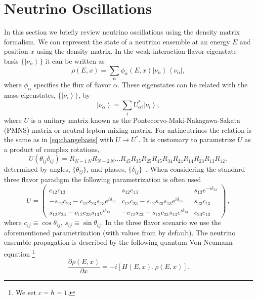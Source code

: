 \documentclass[3p,12pt]{elsarticle}
\newcommand{\bra}[1]{\ensuremath{\left\langle#1\right|}}
\newcommand{\ket}[1]{\ensuremath{\left|#1\right\rangle}}
\newcommand{\pa}[2]{\frac{\partial #1}{\partial #2}}
\begin{document}
\section{Neutrino Oscillations}
\label{sec:theory} 
In this section we briefly review neutrino oscillations
using the density matrix formalism.
We can represent the state of a neutrino ensemble at an energy $E$
and position $x$ using the density matrix. In the weak-interaction flavor-eigenstate basis
$\{\ket{\nu_\alpha}\}$  it can be written as
\begin{equation}
\rho(E,x) = \sum_\alpha \phi_\alpha(E,x) \ket{\nu_\alpha}\bra{\nu_\alpha} , 
\label{eq:state}
\end{equation}
where $\phi_\alpha$ specifies the flux of flavor $\alpha$.
These eigenstates can be related with the mass eigenstates,  $\{ \ket{\nu_i}  \}$, by
\begin{equation}
\ket{\nu_\alpha} = \sum_i U^*_{\alpha i} \ket{\nu_i} ,
\label{eq:changebasis}
\end{equation}
where $U$ is a unitary matrix known as the Pontecorvo-Maki-Nakagawa-Sakata (PMNS)
matrix or neutral lepton mixing matrix. For antineutrinos the relation
is the same as in 
\eqref{eq:changebasis} with $U \to U^*$.
It is customary to parametrize $U$ as a product of complex rotations,
\begin{equation}
\label{eq:mixing}
U(\theta_{ij}\delta_{ij})=R_{N-1\, N} R_{N-2\, N} ... R_{45} R_{35} R_{25} R_{15}
R_{34} R_{24} R_{14} R_{23} R_{13} R_{12}, 
\end{equation}
determined by angles, $\{\theta_{ij}\}$, and phases, $\{ \delta_{ij}
\}$~\cite{SQUIDS}. When considering the standard three flavor paradigm
the following parametrization is often used
\begin{equation}
U
=
\begin{pmatrix}
c_{12} c_{13} & s_{12} c_{13} & s_{13} e^{-i\delta_{13}} \\ 
- s_{12} c_{23} - c_{12} s_{23} s_{13} e^{i\delta_{13}} & c_{12} c_{23} - s_{12} s_{23} s_{13} e^{i\delta_{13}} & s_{23} c_{13} \\
s_{12}s_{23} -c_{12}c_{23}s_{13}e^{i\delta_{13}} & - c_{12} s_{23} - s_{12} c_{23} s_{13} e^{i\delta_{13}} & c_{23} c_{13}
\end{pmatrix}
\,,
\label{eq:U}
\end{equation}
where $c_{ij} \equiv \cos \theta_{ij}$, $s_{ij} \equiv \sin \theta_{ij}$. In the
three flavor scenario we use the aforementioned parametrization (with
values from \citep{Esteban:2016qun} by default).
The neutrino ensemble propagation is
described by the following quantum Von Neumann equation \footnote{We set $c = \hbar = 1$.} 
\begin{equation}
\pa{\rho(E,x)}{x} = -i [ H (E,x), \rho(E,x) ].
\label{eq:schrodinger}
\end{equation}
\end{document}
